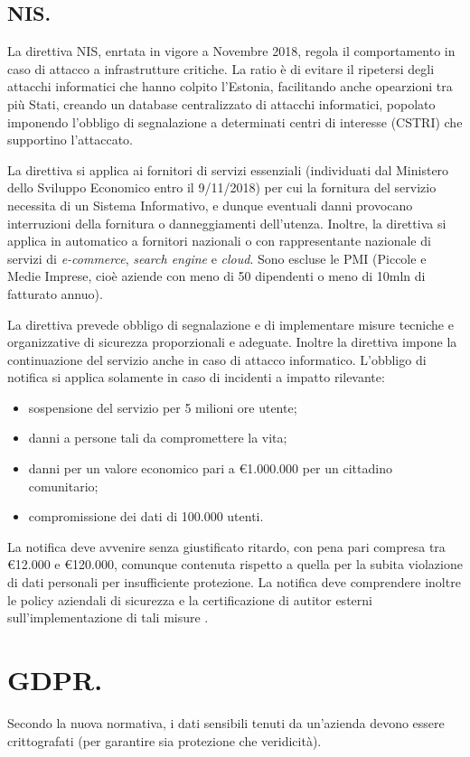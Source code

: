 \documentclass[a4page, 11pt, twocolumn]{article}
\begin{document}
\subsection{NIS.}
La direttiva NIS, enrtata in vigore a Novembre 2018, regola il comportamento in caso di attacco a infrastrutture critiche.
La ratio è di evitare il ripetersi degli attacchi informatici che hanno colpito l'Estonia, facilitando anche opearzioni tra più Stati, creando un database centralizzato di attacchi informatici, popolato imponendo l'obbligo di segnalazione a determinati centri di interesse (CSTRI) che supportino l'attaccato.

La direttiva si applica ai fornitori di servizi essenziali (individuati dal Ministero dello Sviluppo Economico entro il 9/11/2018) per cui la fornitura del servizio necessita di un Sistema Informativo, e dunque eventuali danni provocano interruzioni della fornitura o danneggiamenti dell'utenza.
Inoltre, la direttiva si applica in automatico a fornitori nazionali o con rappresentante nazionale di servizi di \textit{e-commerce}, \textit{search engine} e \textit{cloud}.
Sono escluse le PMI (Piccole e Medie Imprese, cioè aziende con meno di 50 dipendenti o meno di 10mln di fatturato annuo).

La direttiva prevede obbligo di segnalazione e di implementare misure tecniche e organizzative di sicurezza proporzionali e adeguate.
Inoltre la direttiva impone la continuazione del servizio anche in caso di attacco informatico.
L'obbligo di notifica si applica solamente in caso di incidenti a impatto rilevante:
\begin{itemize}
\item sospensione del servizio per 5 milioni ore utente;
\item danni a persone tali da compromettere la vita;
\item danni per un valore economico pari a \euro{1.000.000} per un cittadino comunitario;
\item compromissione dei dati di 100.000 utenti.
\end{itemize}

La notifica deve avvenire senza giustificato ritardo, con pena pari compresa tra \euro{12.000} e \euro{120.000}, comunque contenuta rispetto a quella per la subita violazione di dati personali per insufficiente protezione.
La notifica deve comprendere inoltre le policy aziendali di sicurezza e la certificazione di autitor esterni sull'implementazione di tali misure	.

\section{GDPR.}
Secondo la nuova normativa, i dati sensibili tenuti da un'azienda devono essere crittografati (per garantire sia protezione che veridicità).
\end{document}
